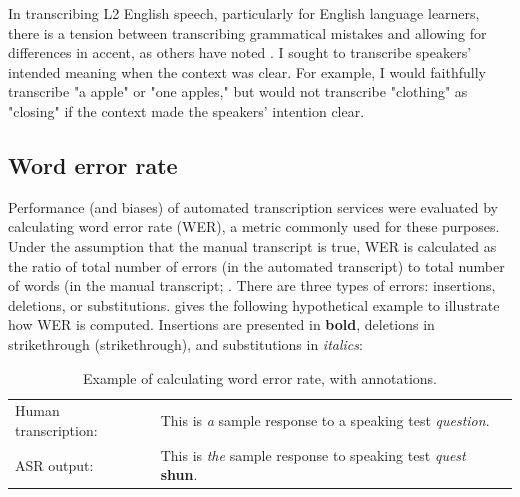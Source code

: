 \documentclass [PhD] {uclathes}
\newlength{\wdth}
\newcommand{\strike}[1]{\settowidth{\wdth}{#1}\rlap{\rule[.5ex]{\wdth}{.4pt}}#1}
\begin{document}
In transcribing L2 English speech, particularly for English language learners, there is a tension between transcribing grammatical mistakes and allowing for differences in accent, as others have noted \citep{yoon2019features}. I sought to transcribe speakers' intended meaning when the context was clear. For example, I would faithfully transcribe "a apple" or "one apples," but would not transcribe "clothing" as "closing" if the context made the speakers' intention clear.

\subsection{Word error rate}
\label{methods_wer}

Performance (and biases) of automated transcription services were evaluated by calculating word error rate (WER), a metric commonly used for these purposes. Under the assumption that the manual transcript is true, WER is calculated as the ratio of total number of errors (in the automated transcript) to total number of words (in the manual transcript; \cite{qian2019automatic}. There are three types of errors: insertions, deletions, or substitutions. \citet[][p. 65]{qian2019automatic} gives the following hypothetical example to illustrate how WER is computed. Insertions are presented in \textbf{bold}, deletions in \strike{strikethrough} (strikethrough), and substitutions in \emph{italics}:

\begin{table}[htbp]
\centering
\caption{\label{tab:wer_example} Example of calculating word error rate, with annotations.}
\small  %
\begin{tabular}{ll}
	\toprule
	Human transcription: & This is \emph{a} sample response to \strike{a} speaking test \emph{question}. \\
	ASR output: & This is \emph{the} sample response to speaking test \emph{quest} \textbf{shun}. \\
	\bottomrule
    \end{tabular}
\end{table}
\end{document}
